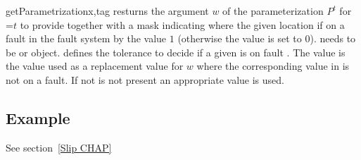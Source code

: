 \begin{methoddesc}[FaultSystem]{getParametrization}{x,tag }
resturns the argument $w$ of the parameterization $P^t$ for =$t$ to provide 
together with a mask indicating where the given location if on a fault in the fault system by the value $1$ (otherwise the value is set to $0$).  needs to be \Vector or \numpyNDA object.  defines the tolerance to decide if a given \DataSamplePoints is on fault . The value
 is the value used as a replacement value for $w$ where the corresponding value in  is not 
on a fault. If not  is not present an appropriate value is used.
\end{methoddesc}

\subsection{Example}
See section~\ref{Slip CHAP}








